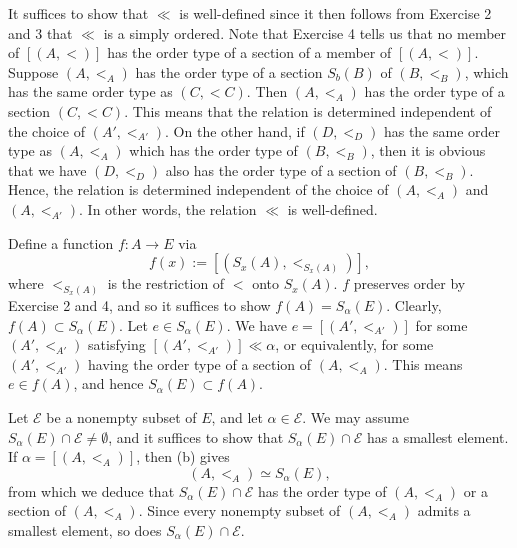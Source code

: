 \documentclass[a4paper,12pt]{article}
\begin{document}
\begin{sol}\leavevmode \par
	It suffices to show that \( \ll \) is well-defined
	since it then follows from Exercise 2 and 3 that \( \ll \) is a simply ordered.
	Note that Exercise 4 tells us that no member of \( \left[ (A,<) \right] \)
	has the order type of a section of a member of \( \left[ (A,<) \right] \).
	Suppose \( (A,<_A) \) has the order type of a section
	\( S_b(B) \) of \( (B,<_B) \),
	which has the same order type as \( (C,<C) \).
	Then \( (A,<_A) \) has the order type of a section \( (C,<C) \).
	This means that the relation  is determined
	independent of the choice of \( (A',<_{A'}) \).
	On the other hand, if \( (D,<_{D}) \) has the same order type as \( (A,<_A) \)
	which has the order type of \( (B,<_B) \),
	then it is obvious that
	we have \( (D,<_{D}) \) also has the order type of a section of \( (B,<_B) \).
	Hence, the relation  is determined
	independent of the choice of \( (A,<_{A}) \) and \( (A,<_{A'}) \).
	In other words, the relation \( \ll \) is well-defined.
	
	Define a function \( f:A \to E \) via
	\begin{equation*}
		f(x):=\left[( S_x(A),<_{S_{x}(A)}) \right],
	\end{equation*}
	where \( <_{S_{x}(A)} \) is the restriction of \( < \) onto \( S_{x}(A) \).
	\( f \) preserves order by Exercise 2 and 4,
	and so it suffices to show \( f(A)=S_{\alpha}(E) \).
	Clearly, \( f(A) \subset S_{\alpha}(E) \).
	Let \( e \in S_{\alpha}(E) \).
	We have
	\( e = \left[ (A',<_{A'}) \right] \)
	for some \( (A',<_{A'}) \)
	satisfying \( \left[  (A',<_{A'}) \right] \ll \alpha \),
	or equivalently,
	for some \( (A',<_{A'}) \) having the order type of a section of \( (A,<_A) \).
	This means \( e\in f(A) \),
	and hence \( S_{\alpha}(E) \subset f(A) \).
	
	Let \( \mathcal{E} \) be a nonempty subset of \( E \),
	and let \( \alpha \in \mathcal{E} \).
	We may assume \( S_{\alpha}(E) \cap \mathcal{E} \neq \emptyset \),
	and it suffices to show that \( S_{\alpha}(E) \cap \mathcal{E}\)
	has a smallest element.
	If \( \alpha = \left[ (A,<_A) \right] \),
	then (b) gives
	\begin{equation*}
		(A,<_A) \simeq S_{\alpha}(E),
	\end{equation*}
	from which we deduce that
	\( S_{\alpha}(E) \cap \mathcal{E}\)
	has the order type of \( (A,<_A) \) or a section of \( (A,<_A) \).
	Since every nonempty subset of \( (A,<_A) \) admits a smallest element,
	so does \( S_{\alpha}(E) \cap \mathcal{E}\).
	

\end{sol}
\end{document}
